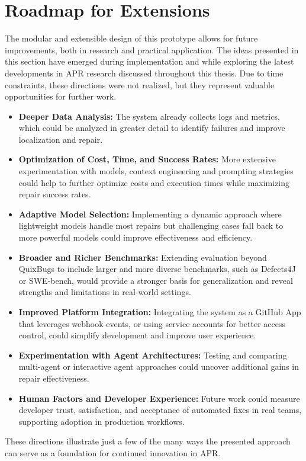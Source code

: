 \section{Roadmap for Extensions} \label{section:roadmap}
The modular and extensible design of this prototype allows for future improvements, both in research and practical application. The ideas presented in this section have emerged during implementation and while exploring the latest developments in \ac{APR} research discussed throughout this thesis. Due to time constraints, these directions were not realized, but they represent valuable opportunities for further work.

\begin{itemize}
    \item \textbf{Deeper Data Analysis:} The system already collects logs and metrics, which could be analyzed in greater detail to identify failures and improve localization and repair.
    \item \textbf{Optimization of Cost, Time, and Success Rates:} More extensive experimentation with models, context engineering and prompting strategies could help to further optimize costs and execution times while maximizing repair success rates.
    \item \textbf{Adaptive Model Selection:} Implementing a dynamic approach where lightweight models handle most repairs but challenging cases fall back to more powerful models could improve effectiveness and efficiency.
    \item \textbf{Broader and Richer Benchmarks:} Extending evaluation beyond QuixBugs to include larger and more diverse benchmarks, such as Defects4J or SWE-bench, would provide a stronger basis for generalization and reveal strengths and limitations in real-world settings.
    \item \textbf{Improved Platform Integration:} Integrating the system as a GitHub App that leverages webhook events, or using service accounts for better access control, could simplify development and improve user experience.
    \item \textbf{Experimentation with Agent Architectures:} Testing and comparing multi-agent or interactive agent approaches could uncover additional gains in repair effectiveness.
    \item \textbf{Human Factors and Developer Experience:} Future work could measure developer trust, satisfaction, and acceptance of automated fixes in real teams, supporting adoption in production workflows.
\end{itemize}

These directions illustrate just a few of the many ways the presented approach can serve as a foundation for continued innovation in \acf{APR}.
